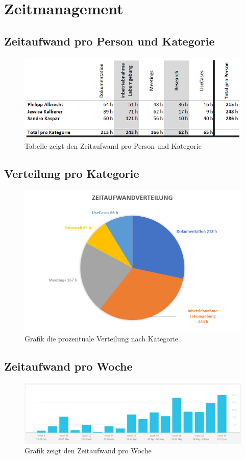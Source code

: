 \section{Zeitmanagement}

\subsection{Zeitaufwand pro Person und Kategorie}
\begin{figure}[H]
	\centering
	\includegraphics[width=16cm]{img/zeitaufwand/zeitaufwand_pro_person.PNG}
	\caption{Tabelle zeigt den Zeitaufwand pro Person und Kategorie}	\label{fig:zeitmanagement-person-kategorie}
\end{figure} 

\subsection{Verteilung pro Kategorie}
\begin{figure}[H]
	\centering
	\includegraphics[width=15cm]{img/zeitaufwand/zeitaufwandverteilung.PNG}
	\caption{Grafik die prozentuale Verteilung nach Kategorie}
	\label{fig:zeitmanagement-kategorie}
\end{figure} 

\subsection{Zeitaufwand pro Woche}
\begin{figure}[H]
	\centering
	\includegraphics[width=16cm]{img/zeitaufwand/zeitaufwand_monat.PNG}
	\caption{Grafik zeigt den Zeitaufwand pro Woche}
	\label{fig:zeitmanagement-zeit}
\end{figure} 